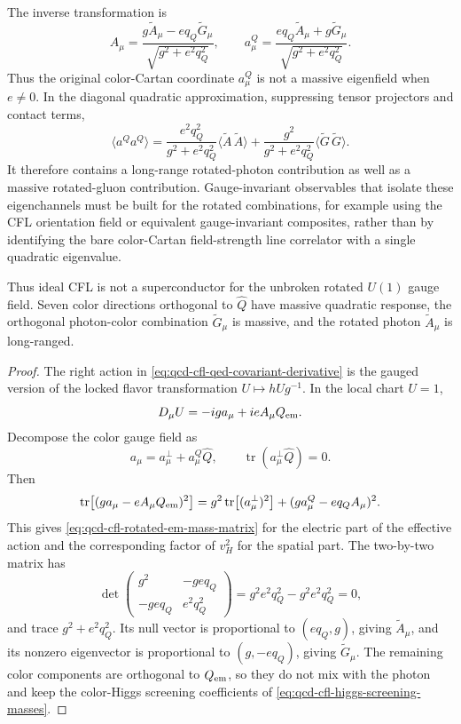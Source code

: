 \begin{proposition}
The inverse transformation is
\begin{equation}
  A_\mu
  =
  \frac{g\widetilde A_\mu-e q_Q\widetilde G_\mu}
       {\sqrt{g^2+e^2q_Q^2}},
  \qquad
  a_\mu^Q
  =
  \frac{e q_Q\widetilde A_\mu+g\widetilde G_\mu}
       {\sqrt{g^2+e^2q_Q^2}}.
  \label{eq:qcd-cfl-rotated-em-inverse}
\end{equation}
Thus the original color-Cartan coordinate \(a_\mu^Q\) is not a massive
eigenfield when \(e\ne0\).  In the diagonal quadratic approximation,
suppressing tensor projectors and contact terms,
\begin{equation}
  \langle a^Q a^Q\rangle
  =
  \frac{e^2q_Q^2}{g^2+e^2q_Q^2}
  \langle\widetilde A\,\widetilde A\rangle
  +
  \frac{g^2}{g^2+e^2q_Q^2}
  \langle\widetilde G\,\widetilde G\rangle .
  \label{eq:qcd-cfl-color-cartan-pole-content}
\end{equation}
It therefore contains a long-range rotated-photon contribution as well as a
massive rotated-gluon contribution.  Gauge-invariant observables that isolate
these eigenchannels must be built for the rotated combinations, for example
using the CFL orientation field or equivalent gauge-invariant composites,
rather than by identifying the bare color-Cartan field-strength line
correlator with a single quadratic eigenvalue.

Thus ideal CFL is not a superconductor for the unbroken rotated
\(U(1)\) gauge field.  Seven color directions orthogonal to \(\widehat Q\)
have massive quadratic response, the orthogonal photon-color combination
\(\widetilde G_\mu\) is massive, and the rotated photon
\(\widetilde A_\mu\) is long-ranged.
\end{proposition}

\begin{proof}
The right action in
\eqref{eq:qcd-cfl-qed-covariant-derivative} is the gauged version of the
locked flavor transformation \(U\mapsto hUg^{-1}\).  In the local chart
\(U=1\),
\[
  D_\mu U=-i g a_\mu+i e A_\mu Q_{\rm em}.
\]
Decompose the color gauge field as
\[
  a_\mu=a_\mu^\perp+a_\mu^Q\widehat Q,
  \qquad
  \operatorname{tr}(a_\mu^\perp\widehat Q)=0.
\]
Then
\[
  \operatorname{tr}\!\left[
    (g a_\mu-eA_\mu Q_{\rm em})^2
  \right]
  =
  g^2\operatorname{tr}\!\left[(a_\mu^\perp)^2\right]
  +(g a_\mu^Q-e q_QA_\mu)^2.
\]
This gives
\eqref{eq:qcd-cfl-rotated-em-mass-matrix} for the electric part of the
effective action and the corresponding factor of \(v_H^2\) for the spatial
part.  The two-by-two matrix has
\[
  \det
  \begin{pmatrix}
    g^2 & -g e q_Q\\
    -g e q_Q & e^2 q_Q^2
  \end{pmatrix}
  =
  g^2e^2q_Q^2-g^2e^2q_Q^2=0,
\]
and trace \(g^2+e^2q_Q^2\).  Its null vector is proportional to
\((e q_Q,g)\), giving \(\widetilde A_\mu\), and its nonzero eigenvector is
proportional to \((g,-e q_Q)\), giving \(\widetilde G_\mu\).  The remaining
color components are orthogonal to \(Q_{\rm em}\), so they do not mix with
the photon and keep the color-Higgs screening coefficients of
\eqref{eq:qcd-cfl-higgs-screening-masses}.
\end{proof}

